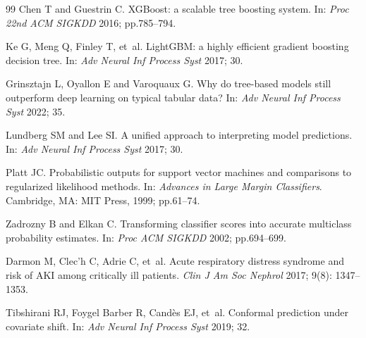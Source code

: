 \documentclass[12pt]{article}
\begin{document}
\begin{thebibliography}{99}
Chen T and Guestrin C.
XGBoost: a scalable tree boosting system.
In: \textit{Proc 22nd ACM SIGKDD} 2016; pp.785--794.

Ke G, Meng Q, Finley T, et~al.
LightGBM: a highly efficient gradient boosting decision tree.
In: \textit{Adv Neural Inf Process Syst} 2017; 30.

Grinsztajn L, Oyallon E and Varoquaux G.
Why do tree-based models still outperform deep learning on
typical tabular data?
In: \textit{Adv Neural Inf Process Syst} 2022; 35.

Lundberg SM and Lee SI.
A unified approach to interpreting model predictions.
In: \textit{Adv Neural Inf Process Syst} 2017; 30.

Platt JC.
Probabilistic outputs for support vector machines and
comparisons to regularized likelihood methods.
In: \textit{Advances in Large Margin Classifiers}.
Cambridge, MA: MIT Press, 1999; pp.61--74.

Zadrozny B and Elkan C.
Transforming classifier scores into accurate multiclass
probability estimates.
In: \textit{Proc ACM SIGKDD} 2002; pp.694--699.

Darmon M, Clec'h C, Adrie C, et~al.
Acute respiratory distress syndrome and risk of AKI among
critically ill patients.
\textit{Clin J Am Soc Nephrol} 2017; 9(8): 1347--1353.

Tibshirani RJ, Foygel Barber R, Cand\`{e}s EJ, et~al.
Conformal prediction under covariate shift.
In: \textit{Adv Neural Inf Process Syst} 2019; 32.

\end{thebibliography}
\end{document}
